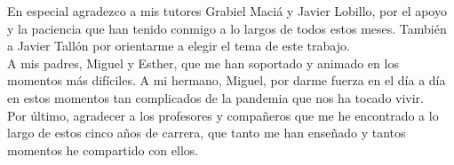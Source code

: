        \vspace{1cm}


En especial agradezco a mis tutores Grabiel Maciá y Javier Lobillo, por el apoyo y la paciencia que han tenido conmigo a lo largos de todos estos meses. También a Javier Tallón por orientarme a elegir el tema de este trabajo.\\

A mis padres, Miguel y Esther, que me han soportado y animado en los momentos más difíciles. A mi hermano, Miguel, por darme fuerza en el día a día en estos momentos tan complicados de la pandemia que nos ha tocado vivir.\\

Por último, agradecer a los profesores y compañeros que me he encontrado a lo largo de estos cinco años de carrera, que tanto me han enseñado y tantos momentos he compartido con ellos.\\
